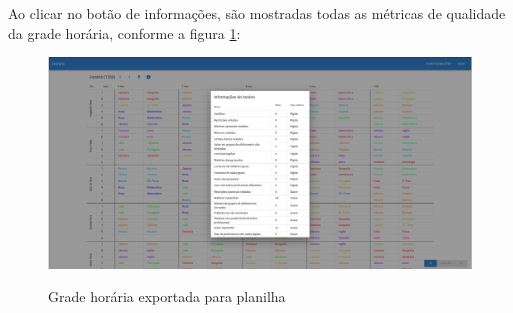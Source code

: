 Ao clicar no botão de informações, são mostradas todas as métricas de qualidade da grade horária, conforme a figura \ref{fig:informacoesHorario}:

\begin{figure}[!htb]
	\centering
	\caption{Grade horária exportada para planilha}
	\includegraphics[width=1\textwidth]{./dados/figuras/informacoes_horario}
	\label{fig:informacoesHorario}
\end{figure}


